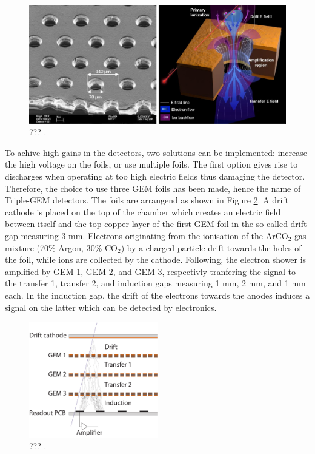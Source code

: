     \begin{figure}[h!]
      \centering
      \includegraphics[width=\textwidth]{img/II-1-gem/holes.pdf}
      \caption{??? \cite{Colaleo:2021453}.}
      \label{fig:II-1-gem-holes}
    \end{figure}

    To achive high gains in the detectors, two solutions can be implemented: increase the high voltage on the foils, or use multiple foils. The first option gives rise to discharges when operating at too high electric fields thus damaging the detector. Therefore, the choice to use three GEM foils has been made, hence the name of Triple-GEM detectors. The foils are arrangend as shown in Figure \ref{fig:II-1-gem-triple}. A drift cathode is placed on the top of the chamber which creates an electric field between itself and the top copper layer of the first GEM foil in the so-called drift gap measuring 3 mm. Electrons originating from the ionisation of the ArCO$_2$ gas mixture (70\% Argon, 30\% CO$_2$) by a charged particle drift towards the holes of the foil, while ions are collected by the cathode. Following, the electron shower is amplified by GEM 1, GEM 2, and GEM 3, respectivly tranfering the signal to the transfer 1, transfer 2, and induction gaps measuring 1 mm, 2 mm, and 1 mm each. In the induction gap, the drift of the electrons towards the anodes induces a signal on the latter which can be detected by electronics. \\

    \begin{figure}[h!]
      \centering
      \includegraphics[width=0.5\textwidth]{img/II-1-gem/triple-gem-foils.pdf}
      \caption{??? \cite{Colaleo:2021453}.}
      \label{fig:II-1-gem-triple}
    \end{figure}

